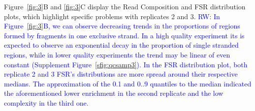 \documentclass{bmcart}
\newcommand{\RW}[1]{\textcolor{blue}{RW: #1}}
\begin{document}
Figure~\ref{fig:3}B and \ref{fig:3}C display the Read Composition and
FSR distribution plots, which highlight specific problems with
replicates 2 and 3. \RW{In Figure~\ref{fig:3}B, we can observe
  decreasing trends in the proportions of regions formed by fragments
  in one exclusive strand. In a high quality experiment its is
  expected to observe an exponential decay in the proportion of single
  stranded regions, while in lower quality experiments the trend may
  be linear of even constant (Supplement
  Figure~\ref{sfig:qcsamp3}). In the FSR distribution plot, both
  replicate 2 and 3 FSR's distributions are more spread around their
  respective medians. The approximation of the 0.1 and 0..9 quantiles
  to the median indicated the aforementioned lower enrichment in the
  second replicate and the low complexity in the third one.
 }

\end{document}
